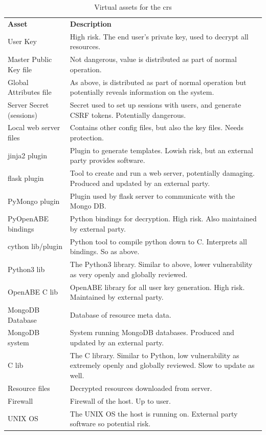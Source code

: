 \begin{appendices}
\begin{table}[htp]
  \begin{tabularx}{\linewidth}{lX}
    \textbf{Asset}            & \textbf{Description} \\
    User Key                  & High risk. The end user's private key, used to decrypt all resources. \\
    Master Public Key file    &	Not dangerous, value is distributed as part of normal operation. \\
    Global Attributes file    &	As above, is distributed as part of normal operation but potentially reveals information on the system. \\
    Server Secret (sessions)  &	Secret used to set up sessions with users, and generate CSRF tokens. Potentially dangerous. \\
    Local web server files    &	Contains other config files, but also the key files. Needs protection. \\
    jinja2 plugin             &	Plugin to generate templates. Lowish risk, but an external party provides software. \\
    flask plugin              &	Tool to create and run a web server, potentially damaging. Produced and updated by an external party. \\
    PyMongo plugin            &	Plugin used by flask server to communicate with the Mongo DB. \\
    PyOpenABE bindings        &	Python bindings for decryption. High risk. Also maintained by external party. \\
    cython lib/plugin         &	Python tool to compile python down to C. Interprets all bindings. So as above. \\
    Python3 lib               &	The Python3 library. Similar to above, lower vulnerability as very openly and globally reviewed. \\
    OpenABE C lib             &	OpenABE library for all user key generation. High risk. Maintained by external party. \\
    MongoDB Database          & Database of resource meta data. \\
    MongoDB system            & System running MongoDB databases. Produced and updated by an external party. \\
    C lib                     &	The C library. Similar to Python, low vulnerability as extremely openly and globally reviewed. Slow to update as well. \\
    Resource files            & Decrypted resources downloaded from server. \\
    Firewall                  &	Firewall of the host. Up to user. \\
    UNIX OS                   &	The UNIX OS the host is running on. External party software so potential risk.
  \end{tabularx}
  \caption{Virtual assets for the \acrfull{crs}}
  \label{tab:virtual_assets_cr}
\end{table}


\end{appendices}
